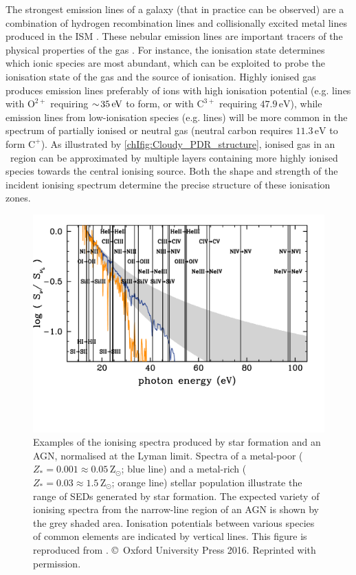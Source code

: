 The strongest emission lines of a galaxy (that in practice can be observed) are a combination of hydrogen recombination lines and collisionally excited metal lines produced in the ISM . These nebular emission lines are important tracers of the physical properties of the gas \citep{2019ARA&A..57..511K}. For instance, the ionisation state determines which ionic species are most abundant, which can be exploited to probe the ionisation state of the gas and the source of ionisation. Highly ionised gas produces emission lines preferably of ions with high ionisation potential (e.g.  lines with $\mathrm{O^{2+}}$ requiring $\sim \! 35 \, \mathrm{eV}$ to form, or  with $\mathrm{C^{3+}}$ requiring $47.9 \, \mathrm{eV}$), while emission lines from low-ionisation species (e.g.  lines) will be more common in the spectrum of partially ionised or neutral gas (neutral carbon requires $11.3 \, \mathrm{eV}$ to form $\mathrm{C^+}$). As illustrated by \cref{chIfig:Cloudy_PDR_structure}, ionised gas in an \HII\ region can be approximated by multiple layers containing more highly ionised species towards the central ionising source. Both the shape and strength of the incident ionising spectrum determine the precise structure of these ionisation zones.
\begin{figure}
    \centering
    \includegraphics[width=0.95\linewidth]{"Figs/Feltre+16_fig1"}
    \caption[Examples of the ionising spectra produced by stars and an AGN.]{Examples of the ionising spectra produced by star formation and an AGN, normalised at the Lyman limit. Spectra of a metal-poor ($Z_* = 0.001 \approx 0.05 \, \mathrm{Z_\odot}$; blue line) and a metal-rich ($Z_* = 0.03 \approx 1.5 \, \mathrm{Z_\odot}$; orange line) stellar population illustrate the range of SEDs generated by star formation. The expected variety of ionising spectra from the narrow-line region of an AGN is shown by the grey shaded area. Ionisation potentials between various species of common elements are indicated by vertical lines. This figure is reproduced from \citet{2016MNRAS.456.3354F}. \copyright\ Oxford University Press 2016. Reprinted with permission.}
    \label{chIfig:Ionisation_potentials}
\end{figure}

